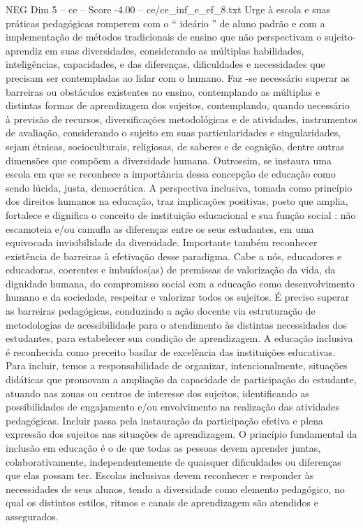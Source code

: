 \begin{textsample}{NEG Dim 5 – ce – Score -4.00 – ce/ce\_inf\_e\_ef\_8.txt}
Urge à escola e suas práticas pedagógicas romperem com o “ ideário ” de aluno padrão e com a implementação de métodos tradicionais de ensino que não perspectivam o sujeito-aprendiz em suas diversidades, considerando as múltiplas habilidades, inteligências, capacidades, e das diferenças, dificuldades e necessidades que precisam ser contempladas ao lidar com o humano.
Faz -se necessário superar as barreiras ou obstáculos existentes no ensino, contemplando as múltiplas e distintas formas de aprendizagem dos sujeitos, contemplando, quando necessário à previsão de recursos, diversificações metodológicas e de atividades, instrumentos de avaliação, considerando o sujeito em suas particularidades e singularidades, sejam étnicas, socioculturais, religiosas, de saberes e de cognição, dentre outras dimensões que compõem a diversidade humana.
Outrossim, se instaura uma escola em que se reconhece a importância dessa concepção de educação como sendo lúcida, justa, democrática.
A perspectiva inclusiva, tomada como princípio dos direitos humanos na educação, traz implicações positivas, posto que amplia, fortalece e dignifica o conceito de instituição educacional e sua função social : não escamoteia e/ou camufla as diferenças entre os seus estudantes, em uma equivocada invisibilidade da diversidade.
Importante também reconhecer existência de barreiras à efetivação desse paradigma.
Cabe a nós, educadores e educadoras, coerentes e imbuídos(as) de premissas de valorização da vida, da dignidade humana, do compromisso social com a educação como desenvolvimento humano e da sociedade, respeitar e valorizar todos os sujeitos.
É preciso superar as barreiras pedagógicas, conduzindo a ação docente via estruturação de metodologias de acessibilidade para o atendimento às distintas necessidades dos estudantes, para estabelecer sua condição de aprendizagem.
A educação inclusiva é reconhecida como preceito basilar de excelência das instituições educativas.
Para incluir, temos a responsabilidade de organizar, intencionalmente, situações didáticas que promovam a ampliação da capacidade de participação do estudante, atuando nas zonas ou centros de interesse dos sujeitos, identificando as possibilidades de engajamento e/ou envolvimento na realização das atividades pedagógicas.
Incluir passa pela instauração da participação efetiva e plena expressão dos sujeitos nas situações de aprendizagem.
O princípio fundamental da inclusão em educação é o de que todas as pessoas devem aprender juntas, colaborativamente, independentemente de quaisquer dificuldades ou diferenças que elas possam ter.
Escolas inclusivas devem reconhecer e responder às necessidades de seus alunos, tendo a diversidade como elemento pedagógico, no qual os distintos estilos, ritmos e canais de aprendizagem são atendidos e assegurados.

\end{textsample}
